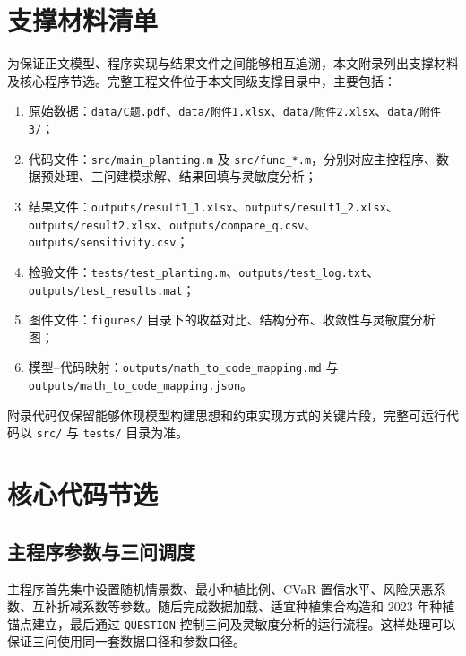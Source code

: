 \appendix

\section{支撑材料清单}

为保证正文模型、程序实现与结果文件之间能够相互追溯，本文附录列出支撑材料及核心程序节选。完整工程文件位于本文同级支撑目录中，主要包括：
\begin{enumerate}
  \item 原始数据：\texttt{data/C题.pdf}、\texttt{data/附件1.xlsx}、\texttt{data/附件2.xlsx}、\texttt{data/附件3/}；
  \item 代码文件：\texttt{src/main\_planting.m} 及 \texttt{src/func\_*.m}，分别对应主控程序、数据预处理、三问建模求解、结果回填与灵敏度分析；
  \item 结果文件：\texttt{outputs/result1\_1.xlsx}、\texttt{outputs/result1\_2.xlsx}、\texttt{outputs/result2.xlsx}、\texttt{outputs/compare\_q.csv}、\texttt{outputs/sensitivity.csv}；
  \item 检验文件：\texttt{tests/test\_planting.m}、\texttt{outputs/test\_log.txt}、\texttt{outputs/test\_results.mat}；
  \item 图件文件：\texttt{figures/} 目录下的收益对比、结构分布、收敛性与灵敏度分析图；
  \item 模型--代码映射：\texttt{outputs/math\_to\_code\_mapping.md} 与 \texttt{outputs/math\_to\_code\_mapping.json}。
\end{enumerate}

附录代码仅保留能够体现模型构建思想和约束实现方式的关键片段，完整可运行代码以 \texttt{src/} 与 \texttt{tests/} 目录为准。

\section{核心代码节选}

\subsection{主程序参数与三问调度}

主程序首先集中设置随机情景数、最小种植比例、CVaR 置信水平、风险厌恶系数、互补折减系数等参数。随后完成数据加载、适宜种植集合构造和 2023 年种植锚点建立，最后通过 \texttt{QUESTION} 控制三问及灵敏度分析的运行流程。这样处理可以保证三问使用同一套数据口径和参数口径。

